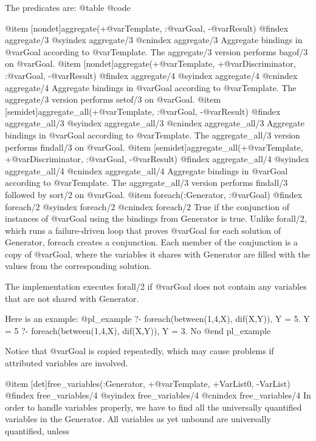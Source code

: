 The predicates are:
@table @code

@item [nondet]aggregate(+@var{Template}, :@var{Goal}, -@var{Result})
@findex aggregate/3
@syindex aggregate/3
@cnindex aggregate/3
    Aggregate bindings in @var{Goal} according to @var{Template}. The
    aggregate/3 version performs bagof/3 on @var{Goal}.
@item [nondet]aggregate(+@var{Template}, +@var{Discriminator}, :@var{Goal}, -@var{Result})
@findex aggregate/4
@syindex aggregate/4
@cnindex aggregate/4
    Aggregate bindings in @var{Goal} according to @var{Template}. The
    aggregate/3 version performs setof/3 on @var{Goal}.
@item [semidet]aggregate_all(+@var{Template}, :@var{Goal}, -@var{Result})
@findex aggregate_all/3
@syindex aggregate_all/3
@cnindex aggregate_all/3
    Aggregate bindings in @var{Goal} according to @var{Template}. The
    aggregate_all/3 version performs findall/3 on @var{Goal}.
@item [semidet]aggregate_all(+@var{Template}, +@var{Discriminator}, :@var{Goal}, -@var{Result})
@findex aggregate_all/4
@syindex aggregate_all/4
@cnindex aggregate_all/4
    Aggregate bindings in @var{Goal} according to @var{Template}. The
    aggregate_all/3 version performs findall/3 followed by sort/2 on
    @var{Goal}.
@item foreach(:Generator, :@var{Goal})
@findex foreach/2
@syindex foreach/2
@cnindex foreach/2
    True if the conjunction of instances of @var{Goal} using the
    bindings from Generator is true. Unlike forall/2, which runs a
    failure-driven loop that proves @var{Goal} for each solution of
    Generator, foreach creates a conjunction. Each member of the
    conjunction is a copy of @var{Goal}, where the variables it shares
    with Generator are filled with the values from the corresponding
    solution.

    The implementation executes forall/2 if @var{Goal} does not contain
    any variables that are not shared with Generator.

    Here is an example:
@pl_example
    ?- foreach(between(1,4,X), dif(X,Y)), Y = 5.
    Y = 5
    ?- foreach(between(1,4,X), dif(X,Y)), Y = 3.
    No
@end pl_example

    Notice that @var{Goal} is copied repeatedly, which may cause
    problems if attributed variables are involved.

@item [det]free_variables(:Generator, +@var{Template}, +VarList0, -VarList)
@findex free_variables/4
@syindex free_variables/4
@cnindex free_variables/4
    In order to handle variables properly, we have to find all the universally quantified variables in the Generator. All variables as yet unbound are universally quantified, unless

